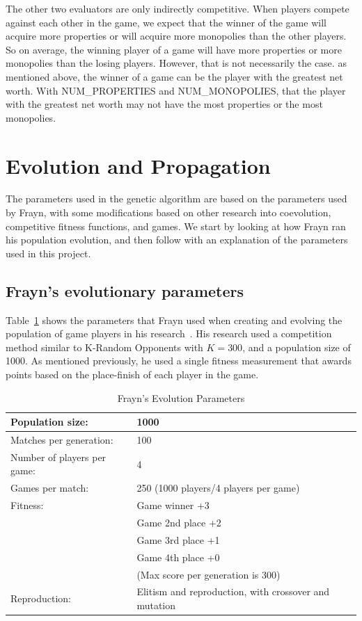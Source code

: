 The other two evaluators are only indirectly competitive. When players compete
against each other in the game, we expect that the winner of the game will
acquire more properties or will acquire more monopolies than the other players.
So on average, the winning player of a game will have more properties or more
monopolies than the losing players. However, that is not necessarily the case.
as mentioned above, the winner of a game can be the player with the greatest net
worth. With NUM\_PROPERTIES and NUM\_MONOPOLIES, that the player with the
greatest net worth may not have the most properties or the most monopolies.

\section{Evolution and Propagation} \label{5_evoprop}

The parameters used in the genetic algorithm are based on the parameters used by
Frayn, with some modifications based on other research into coevolution,
competitive fitness functions, and games. We start by looking at how Frayn ran
his population evolution, and then follow with an explanation of the parameters
used in this project.

\subsection{Frayn's evolutionary parameters}

Table~\ref{table-fraynparams} shows the parameters that Frayn used when creating
and evolving the population of game players in his
research~\cite{DBLP:conf/cig/Frayn05}. His research used a competition method
similar to K-Random Opponents with \(K=300\), and a population size of 1000. As
mentioned previously, he used a single fitness measurement that awards points
based on the place-finish of each player in the game.

\begin{table}[ht]
\caption{Frayn's Evolution Parameters}
\begin{center}
\begin{tabular}{ | l | l | }
  \hline                        
  Population size: & 1000 \\ \hline
  Matches per generation: & 100 \\ \hline
  Number of players per game: & 4 \\ \hline
  Games per match: & 250 (1000 players/4 players per game) \\ \hline
  Fitness: & Game winner	+3 \\
  & Game 2nd place	+2 \\
  & Game 3rd place	+1 \\
  & Game 4th place	+0 \\
  & (Max score per generation is 300) \\ \hline
  Reproduction: & Elitism and reproduction, with crossover and mutation \\ \hline  
\end{tabular}
\label{table-fraynparams}
\end{center}
\end{table}

